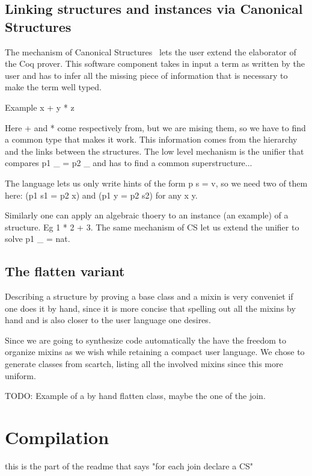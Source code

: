 \documentclass[a4paper,UKenglish,cleveref, autoref]{lipics-v2019}
\begin{document}
\subsection{Linking structures and instances via Canonical Structures}

The mechanism of Canonical Structures~\cite{DBLP:conf/itp/MahboubiT13}
lets the user extend the elaborator of the Coq prover. This software component
takes in input a term as written by the user and has to infer all the missing
piece of information that is necessary to make the term well typed.

Example x + y * z

Here + and * come respectively from, but we are mising them, so we have
to find a common type that makes it work. This information comes from
the hierarchy and the links between the structures. The low level mechanism
is the unifier that compares p1 \_ = p2 \_ and has to find a common
superstructure...

The language lets us only write hints of the form p s = v, so we need two
of them here: (p1 s1 = p2 x) and (p1 y = p2 s2) for any x y.

Similarly one can apply an algebraic thoery to an instance (an example)
of a structure. Eg 1 * 2 + 3. The same mechanism of CS let us
extend the unifier to solve p1 \_ = nat.

\subsection{The flatten variant}

Describing a structure by proving a base class and a mixin is very conveniet
if one does it by hand, since it is more concise that spelling out all the
mixins by hand and is also closer to the user language one desires.

Since we are going to synthesize code automatically the have the freedom
to organize mixins as we wish while retaining a compact user language.
We chose to generate classes from scartch, listing all the involved
mixins since this more uniform.

TODO: Example of a by hand flatten class, maybe the one of the join.

\section{Compilation}\label{sec:compilation}
this is the part of the readme that says "for each join declare a CS"
\end{document}
